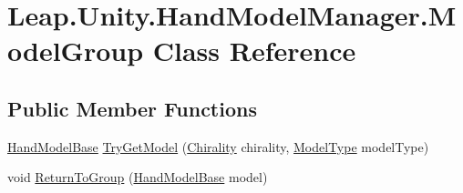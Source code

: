 \hypertarget{class_leap_1_1_unity_1_1_hand_model_manager_1_1_model_group}{}\section{Leap.\+Unity.\+Hand\+Model\+Manager.\+Model\+Group Class Reference}
\label{class_leap_1_1_unity_1_1_hand_model_manager_1_1_model_group}
\subsection*{Public Member Functions}
\begin{DoxyCompactItemize}
\item 
\mbox{\hyperlink{class_leap_1_1_unity_1_1_hand_model_base}{Hand\+Model\+Base}} \mbox{\hyperlink{class_leap_1_1_unity_1_1_hand_model_manager_1_1_model_group_a7860e9dfad7b9f97443e52f499cb59b5}{Try\+Get\+Model}} (\mbox{\hyperlink{namespace_leap_1_1_unity_a4d15adcf20ba121b2cd9c07f503b606f}{Chirality}} chirality, \mbox{\hyperlink{namespace_leap_1_1_unity_a186e5eb0a2b743f1f6b79346f0ab8ad0}{Model\+Type}} model\+Type)
\item 
void \mbox{\hyperlink{class_leap_1_1_unity_1_1_hand_model_manager_1_1_model_group_afda01e931d1d9194a65683edb62673c4}{Return\+To\+Group}} (\mbox{\hyperlink{class_leap_1_1_unity_1_1_hand_model_base}{Hand\+Model\+Base}} model)
\end{DoxyCompactItemize}
